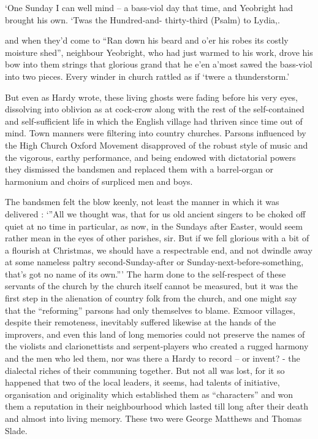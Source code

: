 ‘One Sunday I can well mind – a bass-viol day that time, and Yeobright had brought his own. ‘Twas the Hundred-and- thirty-third (Psalm) to Lydia,.
 
and when they’d come to “Ran down his beard and o’er his robes its costly moisture shed”, neighbour Yeobright, who had just warmed to his work, drove his bow into them strings that glorious grand that he e’en a’most sawed the bass-viol into two pieces. Every winder in church rattled as if ‘twere a thunderstorm.’
 
But even as Hardy wrote, these living ghosts were fading before his very eyes, dissolving into oblivion as at cock-crow along with the rest of the self-contained and self-sufficient life in which the English village had thriven since time out of mind. Town manners were filtering into country churches. Parsons influenced by the High Church Oxford Movement disapproved of the robust style of music and the vigorous, earthy performance, and being endowed with dictatorial powers they dismissed the bandsmen and replaced them with a barrel-organ or harmonium and choirs of surpliced men and boys.

The bandsmen felt the blow keenly, not least the manner in which it was delivered : 
 ‘”All we thought was, that for us old ancient singers to be choked off quiet at no time in particular, as now, in the Sundays after Easter, would seem rather mean in the eyes of other parishes, sir. But if we fell glorious with a bit of a flourish at Christmas, we should have a respectrable end, and not dwindle away at some nameless paltry second-Sunday-after or Sunday-next-before-something, that’s got no name of its own.”’ 
 The harm done to the self-respect of these servants of the church by the church itself cannot be measured, but it was the first step in the alienation of country folk from the church, and one might say that the “reforming” parsons had only themselves to blame. 
 Exmoor villages, despite their remoteness, inevitably suffered likewise at the hands of the improvers, and even this land of long memories could not preserve the names of the violists and clarionettists and serpent-players who created a rugged harmony and the men who led them, nor was there a Hardy to record – or invent? - the dialectal riches of their communing together. 
 But not all was lost, for it so happened that two of the local leaders, it seems, had talents of initiative, organisation and originality which established them as “characters” and won them a reputation in their neighbourhood which lasted till long after their death and almost into living memory. These two were George Matthews and Thomas Slade. 


